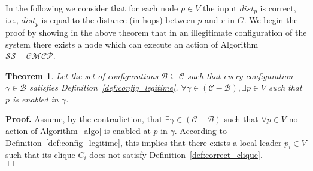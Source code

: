 \documentclass[11pt,letterpaper,onecolumn]{article}
\newtheorem{theorem}{Theorem}
\newenvironment{proof}{\noindent \begin{rm}{\textbf{Proof.} }}{\hspace*{\fill}$\Box$\par\end{rm} \vspace{.3cm}}
\begin{document}
In the following we consider that for each node $p \in V$ the input $dist_p$ is correct, i.e., $dist_p$ is equal to the distance (in hops) between $p$ and $r$ in $G$. We begin the proof by showing in the above theorem that in an illegitimate configuration of the system there exists a node which can execute an action of Algorithm $\mathcal{SS-CMCP}$.

\begin{theorem}
\label{thm:cmcp_enable_action}
Let the set of configurations $\mathcal{B} \subseteq \mathcal{C}$ such that every configuration $\gamma \in \mathcal{B}$ satisfies Definition~\ref{def:config_legitime}. $\forall \gamma \in (\mathcal{C}-\mathcal{B}), \exists p \in V$ such that $p$ is enabled in $\gamma$. 
\end{theorem}

\begin{proof}
Assume, by the contradiction, that $\exists \gamma \in (\mathcal{C}-\mathcal{B})$ such that $\forall p \in V$ no action of Algorithm~\ref{algo} is enabled at $p$ in $\gamma$. According to Definition~\ref{def:config_legitime}, this implies that there exists a local leader $p_i \in V$ such that its clique $C_i$ does not satisfy Definition~\ref{def:correct_clique}.\\

\end{proof}
\end{document}
